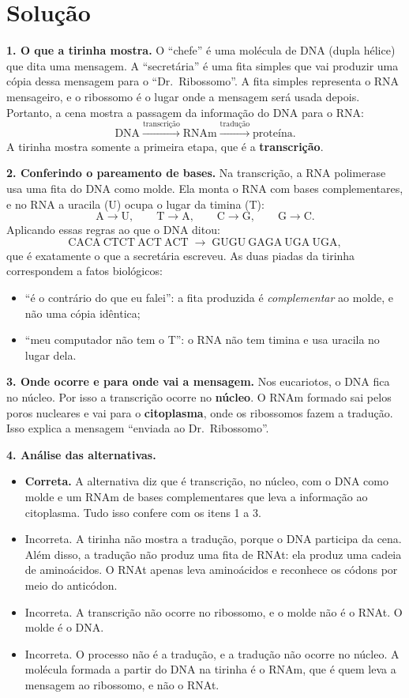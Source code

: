 \documentclass{article}%
\begin{document}
\section*{Solução}

\textbf{1. O que a tirinha mostra.} O ``chefe'' é uma molécula de DNA (dupla hélice) que dita uma mensagem. A ``secretária'' é uma fita simples que vai produzir uma cópia dessa mensagem para o ``Dr.\ Ribossomo''. A fita simples representa o RNA mensageiro, e o ribossomo é o lugar onde a mensagem será usada depois. Portanto, a cena mostra a passagem da informação do DNA para o RNA:
\[
\text{DNA} \xrightarrow{\text{transcrição}} \text{RNAm} \xrightarrow{\text{tradução}} \text{proteína}.
\]
A tirinha mostra somente a primeira etapa, que é a \textbf{transcrição}.

\textbf{2. Conferindo o pareamento de bases.} Na transcrição, a RNA polimerase usa uma fita do DNA como molde. Ela monta o RNA com bases complementares, e no RNA a uracila (U) ocupa o lugar da timina (T):
\[
\text{A} \rightarrow \text{U}, \qquad \text{T} \rightarrow \text{A}, \qquad \text{C} \rightarrow \text{G}, \qquad \text{G} \rightarrow \text{C}.
\]
Aplicando essas regras ao que o DNA ditou:
\[
\text{CACA}\ \text{CTCT}\ \text{ACT}\ \text{ACT} \;\longrightarrow\; \text{GUGU}\ \text{GAGA}\ \text{UGA}\ \text{UGA},
\]
que é exatamente o que a secretária escreveu. As duas piadas da tirinha correspondem a fatos biológicos:
\begin{itemize}
\item ``é o contrário do que eu falei'': a fita produzida é \emph{complementar} ao molde, e não uma cópia idêntica;
\item ``meu computador não tem o T'': o RNA não tem timina e usa uracila no lugar dela.
\end{itemize}

\textbf{3. Onde ocorre e para onde vai a mensagem.} Nos eucariotos, o DNA fica no núcleo. Por isso a transcrição ocorre no \textbf{núcleo}. O RNAm formado sai pelos poros nucleares e vai para o \textbf{citoplasma}, onde os ribossomos fazem a tradução. Isso explica a mensagem ``enviada ao Dr.\ Ribossomo''.

\textbf{4. Análise das alternativas.}
\begin{itemize}
\item[(a)] \textbf{Correta.} A alternativa diz que é transcrição, no núcleo, com o DNA como molde e um RNAm de bases complementares que leva a informação ao citoplasma. Tudo isso confere com os itens 1 a 3.
\item[(b)] Incorreta. A tirinha não mostra a tradução, porque o DNA participa da cena. Além disso, a tradução não produz uma fita de RNAt: ela produz uma cadeia de aminoácidos. O RNAt apenas leva aminoácidos e reconhece os códons por meio do anticódon.
\item[(c)] Incorreta. A transcrição não ocorre no ribossomo, e o molde não é o RNAt. O molde é o DNA.
\item[(d)] Incorreta. O processo não é a tradução, e a tradução não ocorre no núcleo. A molécula formada a partir do DNA na tirinha é o RNAm, que é quem leva a mensagem ao ribossomo, e não o RNAt.
\end{itemize}
\end{document}
